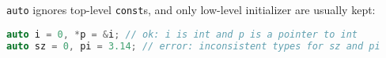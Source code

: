 \texttt{auto} ignores top-level \texttt{const}s, and only low-level initializer are usually kept:
\begin{lstlisting}[language=C++]
auto i = 0, *p = &i; // ok: i is int and p is a pointer to int 
auto sz = 0, pi = 3.14; // error: inconsistent types for sz and pi
\end{lstlisting}






